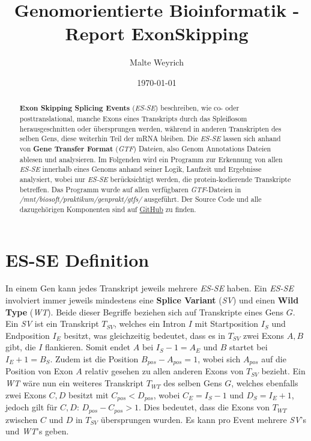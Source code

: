 \documentclass[12pt]{article}
\title{Genomorientierte Bioinformatik - Report ExonSkipping}
\author{
  Malte Weyrich
}
\date{\today}
\begin{document}
\maketitle
\begin{abstract}
	\textbf{Exon Skipping Splicing Events} (\textit{ES-SE}) beschreiben, wie co- oder posttranslational,
	manche Exons eines Transkripts durch das Splei\ss osom herausgeschnitten oder übersprungen werden, während
	in anderen Transkripten des selben Gens, diese weiterhin Teil der mRNA bleiben.
	Die \textit{ES-SE} lassen sich anhand von \textbf{Gene Transfer Format} (\textit{GTF}) Dateien,
	also Genom Annotations Dateien ablesen und analysieren.
	Im Folgenden wird ein Programm zur Erkennung von allen \textit{ES-SE} innerhalb eines Genoms
	anhand seiner Logik, Laufzeit und Ergebnisse analysiert, wobei nur \textit{ES-SE} berücksichtigt werden,
	die protein-kodierende Transkripte betreffen. Das Programm wurde auf allen verfügbaren
	\textit{GTF}-Dateien in \textit{/mnt/biosoft/praktikum/genprakt/gtfs/} ausgeführt.
	Der Source Code und alle dazugehörigen Komponenten sind auf \href{https://github.com/mweyrich28/exonSkipping}{GitHub} zu finden.
\end{abstract}

\newpage
\tableofcontents
\newpage



\section{ES-SE Definition}\label{sec:problem}
In einem Gen kann jedes Transkript jeweils mehrere \textit{ES-SE} haben.
Ein \textit{ES-SE} involviert immer jeweils mindestens eine \textbf{Splice Variant} (\textit{SV}) und einen
\textbf{Wild Type} (\textit{WT}). Beide dieser Begriffe beziehen sich auf Transkripte eines Gens $G$.
Ein \textit{SV} ist ein Transkript $T_{SV}$, welches ein Intron $I$ mit Startposition $I_{S}$ und Endposition
$I_{E}$ besitzt, was gleichzeitig bedeutet, dass es in $T_{SV}$ zwei Exons $A, B$ gibt, die $I$ flankieren. Somit endet $A$ bei $I_{S} - 1 = A_{E}$ und $B$ startet bei $I_{E} + 1 = B_{S}$.
Zudem ist die Position $B_{pos} - A_{pos} = 1$, wobei sich $A_{pos}$ auf die Position von Exon $A$ relativ gesehen
zu allen anderen Exons von $T_{SV}$ bezieht.
Ein \textit{WT} wäre nun ein weiteres Transkript $T_{WT}$ des selben Gens $G$, welches ebenfalls
zwei Exons $C, D$ besitzt mit $C_{pos} < D_{pos}$, wobei $C_{E} = I_{S} - 1$ und $D_{S} = I_{E} + 1$,
jedoch gilt für $C, D$: $D_{pos} - C_{pos} > 1$.
Dies bedeutet, dass die Exons von $T_{WT}$ zwischen $C$ und $D$ in $T_{SV}$ übersprungen wurden.
Es kann pro Event mehrere \textit{SV}'s und \textit{WT}'s geben.
\end{document}
